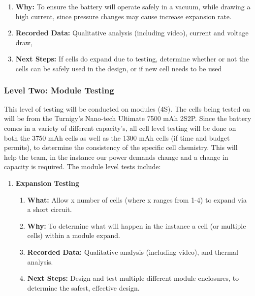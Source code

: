 \documentclass[main.tex]{subfiles}
\begin{document}
\begin{enumerate}
\begin{enumerate}
            \item \textbf{Why: }To ensure the battery will operate safely in a vacuum, while drawing a high current, since pressure changes may cause increase expansion rate.
            \item \textbf{Recorded Data: }Qualitative analysis (including video), current and voltage draw,
            \item \textbf{Next Steps: }If cells do expand due to testing, determine whether or not the cells can be safely used in the design, or if new cell needs to be used
        \end{enumerate}
    \end{enumerate}
    \subsubsection{Level Two: Module Testing}
    This level of testing will be conducted on modules (4S). The cells being tested on will be from the Turnigy’s Nano-tech Ultimate  7500 mAh 2S2P. Since the battery comes in a variety of different capacity’s, all cell level testing will be done on both the 3750 mAh cells as well as the 1300 mAh cells (if time and budget permits), to determine the consistency of the specific cell chemistry. This will help the team, in the instance our power demands change and a change in capacity is required. The module level tests include:
    \begin{enumerate}
        \item \textbf{Expansion Testing}
        \begin{enumerate}
            \item \textbf{What: }Allow x number of cells (where x ranges from 1-4) to expand via a short circuit.
            \item \textbf{Why: }To determine what will happen in the instance a cell (or multiple cells) within a module expand.
            \item \textbf{Recorded Data: }Qualitative analysis (including video), and thermal analysis.
            \item \textbf{Next Steps: }Design and test multiple different module enclosures, to determine the safest, effective design.
        \end{enumerate}
    \end{enumerate}
\end{document}

